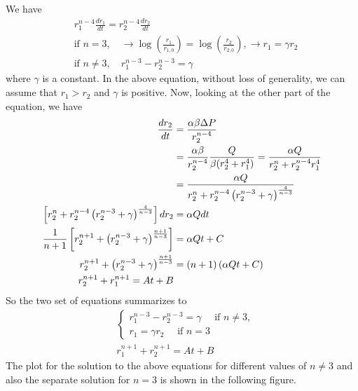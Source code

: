 We have
%
\begin{align}
  &r_{1}^{n-4} \frac{dr_{1}}{dt} = r_2^{n-4}\frac{dr_{2}}{dt}\\
  &\text{if }n=3, \quad \to \log(\frac{r_{1}}{r_{1,0}}) = \log(\frac{r_{2}}{r_{2,0}}), \to r_1 = \gamma r_2 \\
  & \text{if }n\neq 3, \quad r_1^{n-3} - r_2^{n-3} = \gamma
\end{align}
%
where $\gamma$ is a constant. In the above equation, without loss of
generality, we can assume that $r_{1}>r_2$ and $\gamma$ is
positive. Now, looking at the other part of the equation, we have
%
\begin{align}
  \frac{dr_{2}}{dt}  & =  \frac{\alpha \beta \Delta P}{r^{n-4}_{2}} \\
                     & = \frac{\alpha \beta }{r^{n-4}_{2}} \frac{Q}{\beta (r_{2}^{4} + r_1^4)} = \frac{\alpha Q}{r^{n}_{2} + r_{2}^{n-4} r_1^{4}} \\
                     & = \frac{\alpha Q}{r^{n}_{2} + r_{2}^{n-4} \left( r_2^{n-3} + \gamma \right)^{\frac{4}{n-3} }}\\
  \left[ r^{n}_{2} + r_{2}^{n-4} \left( r_2^{n-3} + \gamma \right)^{\frac{4}{n-3} }\right] dr_2 & = \alpha Q dt\\
  \frac{1}{n+1} \left[ r_2^{n+1} + \left( r_2^{n-3} + \gamma\right)^{\frac{n+1}{n-3} } \right]  & = \alpha Qt + C\\
  r_2^{n+1} + \left( r_2^{n-3} + \gamma\right)^{\frac{n+1}{n-3} }  & = (n+1)\left( \alpha Qt + C\right) \\
  r_2^{n+1} + r_{1}^{n+1} = At+B
\end{align}
%
So the two set of equations summarizes to
%
\begin{align}
  & \begin{cases}
    r_1^{n-3} - r_2^{n-3} = \gamma \quad \text{ if }n \neq 3,   \\
    r_1 = \gamma r_{2} \quad \text{ if } n=3
  \end{cases}\\
  & r_1^{n+1} + r_2^{n+1} = At + B
\end{align}
%
The plot for the solution to the above equations for different values
of $n\neq 3$ and also the separate solution for $n=3$ is shown in the
following figure.  
%

